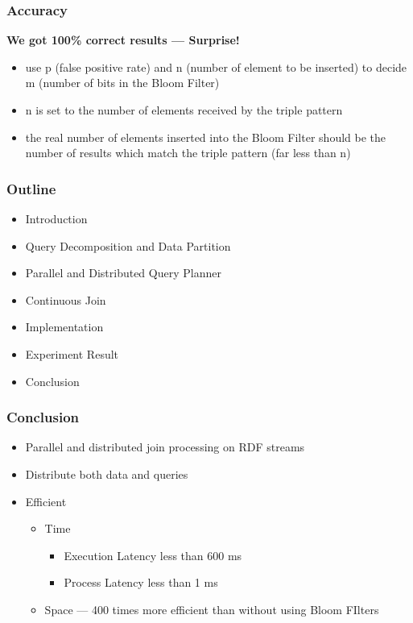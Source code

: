 \begin{frame}
\frametitle{Accuracy}
\textbf{We got 100\% correct results --- Surprise!}

\begin{itemize}
\item use p (false positive rate) and n (number of element to be inserted) to decide m (number of bits in the Bloom Filter)

\item n is set to the number of elements received by the triple pattern

\item the real number of elements inserted into the Bloom Filter should be the number of results which match the triple pattern (far less than n)
\end{itemize}

\end{frame}

\begin{frame}
\frametitle{Outline}
	\begin{itemize}
		\item Introduction
		\item Query Decomposition and Data Partition
		\item Parallel and Distributed Query Planner
		\item Continuous Join
		\item Implementation
		\item Experiment Result
		\item Conclusion
	\end{itemize}
\end{frame}

\begin{frame}
\frametitle{Conclusion}
\begin{itemize}
\item Parallel and distributed join processing on RDF streams
\item Distribute both data and queries
\item Efficient
\begin{itemize}
\item Time 
\begin{itemize}
\item Execution Latency less than 600 ms
\item Process Latency less than 1 ms
\end{itemize}
\item Space --- 400 times more efficient than without using Bloom FIlters
\end{itemize}
\end{itemize}
\end{frame}

